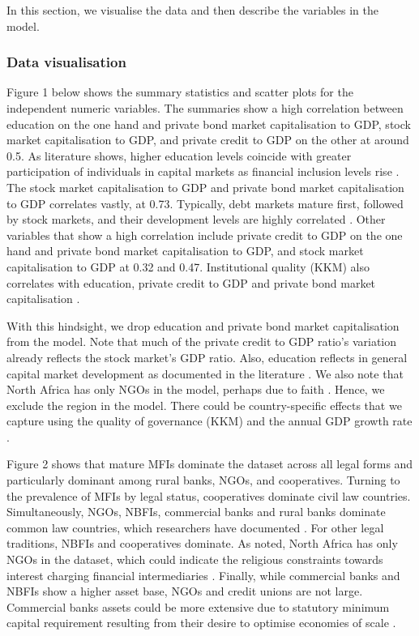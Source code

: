 \documentclass[a4paper,nobind]{templates/ociamthesis}
\begin{document}
In this section, we visualise the data and then describe the variables in the model.

\hypertarget{data-visualisation}{%
\subsubsection{Data visualisation}\label{data-visualisation}}

Figure 1 below shows the summary statistics and scatter plots for the independent numeric variables. The summaries show a high correlation between education on the one hand and private bond market capitalisation to GDP, stock market capitalisation to GDP, and private credit to GDP on the other at around 0.5. As literature shows, higher education levels coincide with greater participation of individuals in capital markets as financial inclusion levels rise \autocite{allen2013resolving,allen2014african,ito2018quantity}. The stock market capitalisation to GDP and private bond market capitalisation to GDP correlates vastly, at 0.73. Typically, debt markets mature first, followed by stock markets, and their development levels are highly correlated \autocite{levine1999stock}. Other variables that show a high correlation include private credit to GDP on the one hand and private bond market capitalisation to GDP, and stock market capitalisation to GDP at 0.32 and 0.47. Institutional quality (KKM) also correlates with education, private credit to GDP and private bond market capitalisation \autocite{yartey2008determinants}.

With this hindsight, we drop education and private bond market capitalisation from the model. Note that much of the private credit to GDP ratio's variation already reflects the stock market's GDP ratio. Also, education reflects in general capital market development as documented in the literature \autocite{allen2013resolving,allen2014african}. We also note that North Africa has only NGOs in the model, perhaps due to faith \autocite{allen2013resolving,allen2014african,hassan2018religious}. Hence, we exclude the region in the model. There could be country-specific effects that we capture using the quality of governance (KKM) \autocite{kunvcivc2014institutional} and the annual GDP growth rate \autocite{butkiewicz2006institutional}.

Figure 2 shows that mature MFIs dominate the dataset across all legal forms and particularly dominant among rural banks, NGOs, and cooperatives. Turning to the prevalence of MFIs by legal status, cooperatives dominate civil law countries. Simultaneously, NGOs, NBFIs, commercial banks and rural banks dominate common law countries, which researchers have documented \autocite{pashkova2016business}. For other legal traditions, NBFIs and cooperatives dominate. As noted, North Africa has only NGOs in the dataset, which could indicate the religious constraints towards interest charging financial intermediaries \autocite{hassan2018religious}. Finally, while commercial banks and NBFIs show a higher asset base, NGOs and credit unions are not large. Commercial banks assets could be more extensive due to statutory minimum capital requirement resulting from their desire to optimise economies of scale \autocite{aiyar2016does}.
\end{document}
